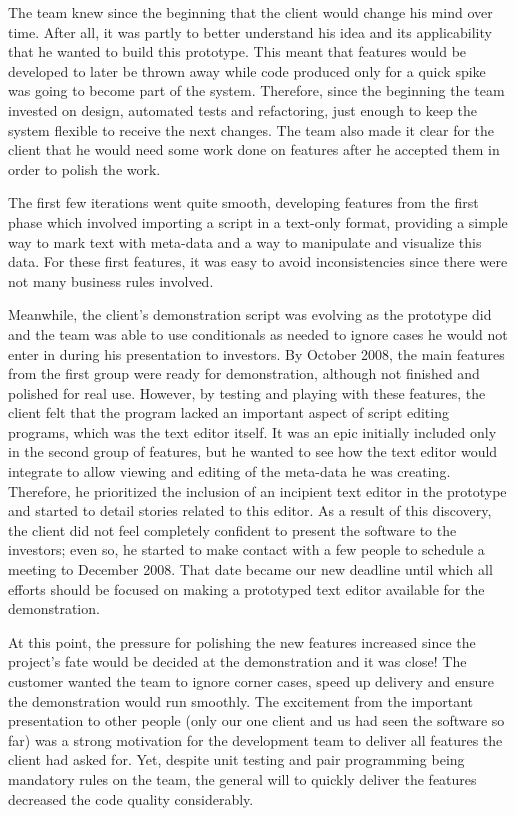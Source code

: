 \documentclass[lnbip]{svmultln}
\begin{document}
The team knew since the beginning that the client would change his
mind over time. After all, it was partly to better understand his idea
and its applicability that he wanted to build this prototype. This
meant that features would be developed to later be thrown away while
code produced only for a quick spike was going to become part of the
system. Therefore, since the beginning the team invested on design,
automated tests and refactoring, just enough to keep the system
flexible to receive the next changes. The team also made it clear for
the client that he would need some work done on features after he
accepted them in order to polish the work.

The first few iterations went quite smooth, developing features from
the first phase which involved importing a script in a text-only
format, providing a simple way to mark text with meta-data and a way
to manipulate and visualize this data. For these first features, it
was easy to avoid inconsistencies since there were not many business
rules involved.

Meanwhile, the client's demonstration script was evolving as the prototype did
and the team was able to use conditionals as needed to ignore cases he would not
enter in during his presentation to investors. By October 2008, the main
features from the first group were ready for demonstration, although not
finished and polished for real use. However, by testing and playing with these
features, the client felt that the program lacked an important aspect of script
editing programs, which was the text editor itself. It was an epic initially
included only in the second group of features, but he wanted to see how the text
editor would integrate to allow viewing and editing of the meta-data he was
creating. Therefore, he prioritized the inclusion of an incipient text editor
in the prototype and started to detail stories related to this editor. As a
result of this discovery, the client did not feel completely confident to
present the software to the investors; even so, he started to make contact with
a few people to schedule a meeting to December 2008. That date became our new
deadline until which all efforts should be focused on making a prototyped text
editor available for the demonstration.

At this point, the pressure for polishing the new features increased
since the project's fate would be decided at the demonstration and it
was close! The customer wanted the team to ignore corner cases, speed
up delivery and ensure the demonstration would run smoothly. The
excitement from the important presentation to other people (only our
one client and us had seen the software so far) was a strong
motivation for the development team to deliver all features the client
had asked for. Yet, despite unit testing and pair programming being
mandatory rules on the team, the general will to quickly deliver the
features decreased the code quality considerably.
\end{document}
